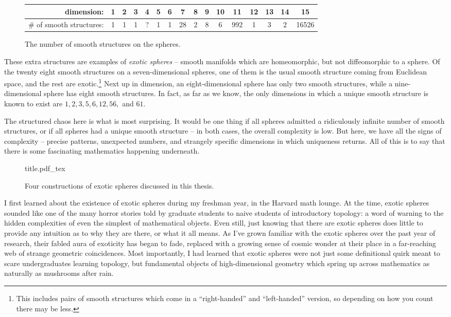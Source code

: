 \begin{figure}[ht]
	\renewcommand{\arraystretch}{1.2}
	\centering
	\begin{tabular}{r|c|c|c|c|c|c|c|c|c|c|c|c|c|c|c}
		\textrm{dimension:}               & 1 & 2 & 3 & 4 & 5 & 6 & 7  & 8 & 9 & 10 & 11  & 12 & 13 & 14 & 15    \\
		\hline
		\textrm{\# of smooth structures:} & 1 & 1 & 1 & ? & 1 & 1 & 28 & 2 & 8 & 6  & 992 & 1  & 3  & 2  & 16526 \\
	\end{tabular}
	\caption{The number of smooth structures on the spheres.}
\end{figure}

These extra structures are examples of \emph{exotic spheres} -- smooth manifolds which are homeomorphic, but not diffeomorphic to a sphere.
Of the twenty eight smooth structures on a seven-dimensional spheres, one of them is the usual smooth structure coming from Euclidean space, and the rest are exotic.\footnote{This includes pairs of smooth structures which come in a ``right-handed'' and ``left-handed'' version, so depending on how you count there may be less.} 
Next up in dimension, an eight-dimensional sphere has only two smooth structures, while a nine-dimensional sphere has eight smooth structures. 
In fact, as far as we know, the only dimensions in which a unique smooth structure is known to exist are $1,2,3,5,6,12,56,$ and $61$.

The structured chaos here is what is most surprising. 
It would be one thing if all spheres admitted a ridiculously infinite number of smooth structures, or if all spheres had a unique smooth structure -- in both cases, the overall complexity is low. 
But here, we have all the signs of complexity -- precise patterns, unexpected numbers, and strangely specific dimensions in which uniqueness returns. All of this is to say that there is some fascinating mathematics happening underneath.

\begin{figure}[ht]
	\centering
	{title.pdf_tex}
	\caption{Four constructions of exotic spheres discussed in this thesis.}
\end{figure}

\smallrule

I first learned about the existence of exotic spheres during my freshman year, in the Harvard math lounge. At the time, exotic spheres sounded like one of the many horror stories told by graduate students to naive students of introductory topology: a word of warning to the hidden complexities of even the simplest of mathematical objects. 
Even still, just knowing that there are exotic spheres does little to provide any intuition as to why they are there, or what it all means. 
As I've grown familiar with the exotic spheres over the past year of research, their fabled aura of exoticity has began to fade, replaced with a growing sense of cosmic wonder at their place in a far-reaching web of strange geometric coincidences.
Most importantly, I had learned that exotic spheres were not just some definitional quirk meant to scare undergraduates learning topology, 
but fundamental objects of high-dimensional geometry which spring up across mathematics as naturally as mushrooms after rain. 

